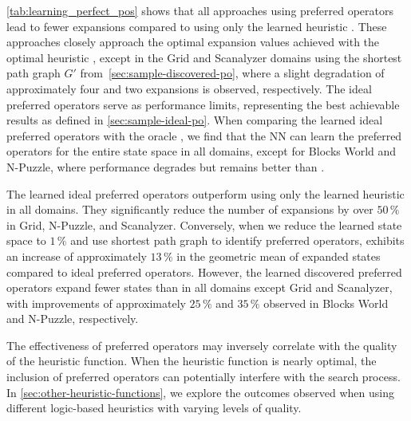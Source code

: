 \documentclass[ppgc,diss,english]{iiufrgs}
\begin{document}


\cref{tab:learning_perfect_pos} shows that all approaches using preferred operators lead to fewer expansions compared to using only the learned heuristic \hnn. These approaches closely approach the optimal expansion values achieved with the optimal heuristic \hstar, except in the Grid and Scanalyzer domains using the shortest path graph $G'$ from~\cref{sec:sample-discovered-po}, where a slight degradation of approximately four and two expansions is observed, respectively. The ideal preferred operators serve as performance limits, representing the best achievable results as defined in \cref{sec:sample-ideal-po}. When comparing the learned ideal preferred operators \postar with the oracle \postartable, we find that the NN can learn the preferred operators for the entire state space in all domains, except for Blocks World and N-Puzzle, where performance degrades but remains better than \hnn.

The learned ideal preferred operators \postar outperform using only the learned heuristic \hnn in all domains. They significantly reduce the number of expansions by over $50\,\%$ in Grid, N-Puzzle, and Scanalyzer. Conversely, when we reduce the learned state space to $1\,\%$ and use shortest path graph to identify preferred operators, \pog exhibits an increase of approximately $13\,\%$ in the geometric mean of expanded states compared to ideal preferred operators. However, the learned discovered preferred operators \pog expand fewer states than \hnn in all domains except Grid and Scanalyzer, with improvements of approximately $25\,\%$ and $35\,\%$ observed in Blocks World and N-Puzzle, respectively.

The effectiveness of preferred operators may inversely correlate with the quality of the heuristic function. When the heuristic function is nearly optimal, the inclusion of preferred operators can potentially interfere with the search process. In \cref{sec:other-heuristic-functions}, we explore the outcomes observed when using different logic-based heuristics with varying levels of quality.
\end{document}
